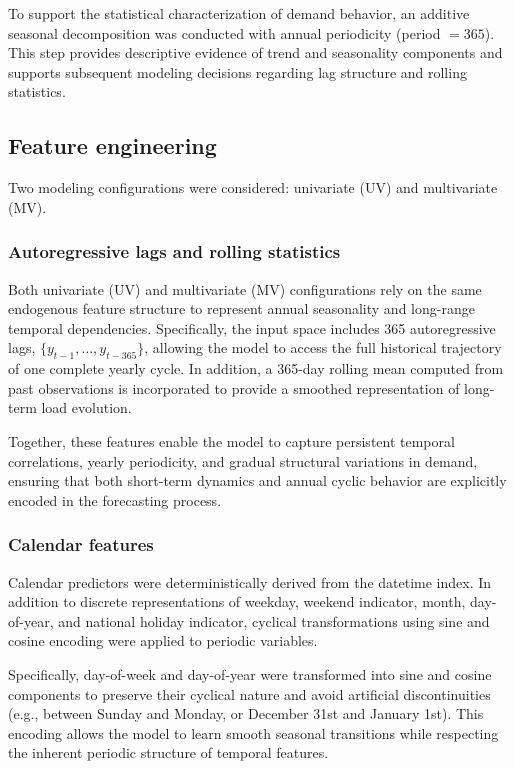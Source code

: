 To support the statistical characterization of demand behavior, an additive seasonal decomposition was conducted with annual periodicity (period $=365$). This step provides descriptive evidence of trend and seasonality components and supports subsequent modeling decisions regarding lag structure and rolling statistics.

\subsection{Feature engineering}
\label{subsec:feature_engineering}

Two modeling configurations were considered: univariate (UV) and multivariate (MV).

\subsubsection{Autoregressive lags and rolling statistics}

Both univariate (UV) and multivariate (MV) configurations rely on the same endogenous feature structure to represent annual seasonality and long-range temporal dependencies. Specifically, the input space includes 365 autoregressive lags, $\{y_{t-1}, \dots, y_{t-365}\}$, allowing the model to access the full historical trajectory of one complete yearly cycle. In addition, a 365-day rolling mean computed from past observations is incorporated to provide a smoothed representation of long-term load evolution. 

Together, these features enable the model to capture persistent temporal correlations, yearly periodicity, and gradual structural variations in demand, ensuring that both short-term dynamics and annual cyclic behavior are explicitly encoded in the forecasting process.


\subsubsection{Calendar features}

Calendar predictors were deterministically derived from the datetime index. In addition to discrete representations of weekday, weekend indicator, month, day-of-year, and national holiday indicator, cyclical transformations using sine and cosine encoding were applied to periodic variables.

Specifically, day-of-week and day-of-year were transformed into sine and cosine components to preserve their cyclical nature and avoid artificial discontinuities (e.g., between Sunday and Monday, or December 31st and January 1st). This encoding allows the model to learn smooth seasonal transitions while respecting the inherent periodic structure of temporal features.


